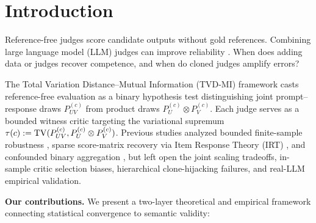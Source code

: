 \section{Introduction}
\label{sec:introduction}

Reference-free judges score candidate outputs without gold references. Combining large language model (LLM) judges can improve reliability \citep{verga2024replacing,zheng2023judging}. When does adding data or judges recover competence, and when do cloned judges amplify errors?

The Total Variation Distance--Mutual Information (TVD-MI) framework
\citep{robertson2026information} casts reference-free evaluation as a binary
hypothesis test distinguishing joint prompt--response draws $P^{(c)}_{UV}$
from product draws $P^{(c)}_U \otimes P^{(c)}_V$. Each judge serves as a
bounded witness critic targeting the variational supremum $\tau(c) :=
\mathrm{TV}(P^{(c)}_{UV}, P^{(c)}_U \otimes P^{(c)}_V)$. Previous studies
analyzed bounded finite-sample robustness \citep{robertson2026information},
sparse score-matrix recovery via Item Response Theory (IRT)
\citep{robertson2025identity}, and confounded binary aggregation
\citep{zhao2026care}, but left open the joint scaling tradeoffs, in-sample
critic selection biases, hierarchical clone-hijacking failures, and real-LLM
empirical validation.

\textbf{Our contributions.} We present a two-layer theoretical and empirical
framework connecting statistical convergence to semantic validity:

